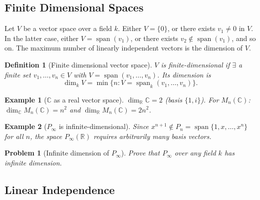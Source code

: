 \documentclass{article}
\newtheorem{definition}{Definition}
\newtheorem{problem}{Problem}
\newtheorem*{example}{Example}
\newcommand{\Span}{\operatorname{span}}
\begin{document}
\subsection{Finite Dimensional Spaces}
Let $V$ be a vector space over a field $k$. Either $V = \{0\}$, or there exists $v_1 \neq 0$ in $V$. In the latter case, either $V = \Span(v_1)$, or there exists $v_2 \notin \Span(v_1)$, and so on. The maximum number of linearly independent vectors is the dimension of $V$.

\begin{definition}[Finite dimensional vector space]
    $V$ is finite-dimensional if $\exists$ a finite set $v_1,\ldots,v_n \in V$ with $V = \Span(v_1,\ldots,v_n)$. Its dimension is
    \[\dim_k V = \min\{n : V = \Span_k(v_1,\ldots,v_n)\}.\]
\end{definition}
\begin{example}[$\mathbb{C}$ as a real vector space]
    $\dim_{\mathbb{R}}\mathbb{C} = 2$ (basis $\{1,i\}$). For $M_n(\mathbb{C})$: $\dim_{\mathbb{C}} M_n(\mathbb{C}) = n^2$ and $\dim_{\mathbb{R}} M_n(\mathbb{C}) = 2n^2$.
\end{example}
\begin{example}[$P_\infty$ is infinite-dimensional]
    Since $x^{n+1} \notin P_n = \Span\{1,x,\ldots,x^n\}$ for all $n$, the space $P_\infty(\mathbb{R})$ requires arbitrarily many basis vectors.
\end{example}
\begin{problem}[Infinite dimension of $P_\infty$]
    Prove that $P_\infty$ over any field $k$ has infinite dimension.
\end{problem}

\subsection{Linear Independence}
\end{document}
